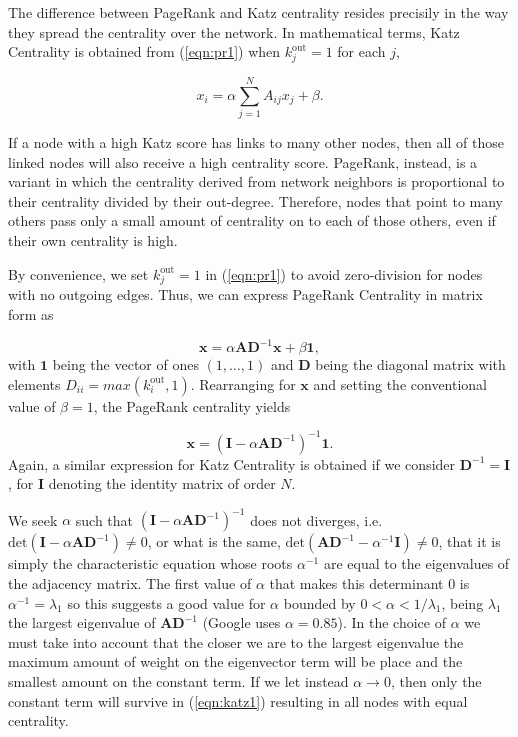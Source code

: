 The difference between PageRank and Katz centrality resides precisily in the way they spread the centrality over the network. In mathematical terms, Katz Centrality is obtained from (\ref{eqn:pr1}) when $k_j^{\text{out}}=1$ for each $j$,

\begin{equation}
\label{eqn:katz1}
    x_i= \alpha\sum_{j=1}^{N}A_{ij}x_j + \beta.
\end{equation}

If a node with a high Katz score has links to many other nodes, then all of those linked nodes will also receive a high centrality score. PageRank, instead, is a variant in which the centrality derived from network neighbors is proportional to their centrality divided by their out-degree. Therefore, nodes that point to many others pass only a small amount of centrality on to each of those others, even if their own centrality is high.

By convenience, we set $k_j^{\text{out}}=1$ in (\ref{eqn:pr1}) to avoid zero-division for nodes with no outgoing edges. Thus, we can express PageRank Centrality in matrix form as

\begin{equation}
\label{eqn:pr2}
    \mathbf{x} = \alpha\mathbf{AD}^{-1}\mathbf{x} + \beta \mathbf{1},
\end{equation}
with $\mathbf{1}$ being the vector of ones $(1,\dots,1)$ and $\mathbf{D}$ being the diagonal matrix with elements $D_{ii} = max(k_i^{\text{out}},1)$. Rearranging for $\mathbf{x}$ and setting the conventional value of $\beta=1$, the PageRank centrality yields

\begin{equation}
\label{eqn:pr3}
    \mathbf{x} = (\mathbf{I} - \alpha\mathbf{AD}^{-1})^{-1} \mathbf{1}.
\end{equation}
Again, a similar expression for Katz Centrality is obtained if we consider $\mathbf{D}^{-1}= \mathbf{I}$, for $\mathbf{I}$ denoting the identity matrix of order $N$.

We seek $\alpha$ such that $(\mathbf{I}-\alpha\mathbf{AD}^{-1})^{-1}$ does not diverges, i.e. $\text{det}(\mathbf{I}-\alpha\mathbf{AD}^{-1})\neq 0$, or what is the same, $\text{det}(\mathbf{AD}^{-1}-\alpha^{-1}\mathbf{I})\neq 0$, that it is simply the characteristic equation whose roots $\alpha^{-1}$ are equal to the eigenvalues of the adjacency matrix. The first value of $\alpha$ that makes this determinant $0$ is $\alpha^{-1}=\lambda_1$ so this suggests a good value for $\alpha$ bounded by $0 < \alpha < 1/\lambda_1 $, being $\lambda_1$ the largest eigenvalue of $\mathbf{AD}^{-1}$ (Google uses $\alpha = 0.85$). In the choice of $\alpha$ we must take into account that the closer we are to the largest eigenvalue the maximum amount of weight on the eigenvector term will be place and the smallest amount on the constant term. If we let instead $\alpha\to 0$, then only the constant term will survive in (\ref{eqn:katz1}) resulting in all nodes with equal centrality.

